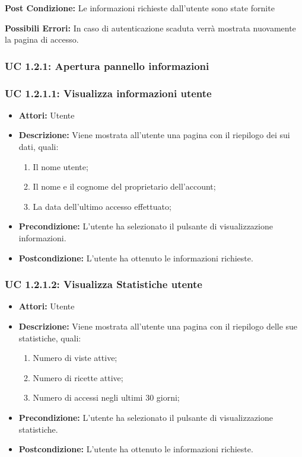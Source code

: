 \textbf{Post Condizione:}
Le informazioni richieste dall'utente sono state fornite

\textbf{Possibili Errori:}
In caso di autenticazione scaduta verrà mostrata nuovamente la pagina di accesso.

\subsubsection{UC 1.2.1: Apertura pannello informazioni}

\subsubsection{UC 1.2.1.1: Visualizza informazioni utente}

\begin{itemize}
\item \textbf{Attori:} Utente
\item \textbf{Descrizione:} Viene mostrata all'utente una pagina con il riepilogo dei sui dati, quali:
\begin{enumerate}
\item Il nome utente;
\item Il nome e il cognome del proprietario dell'account;
\item La data dell'ultimo accesso effettuato;
\end{enumerate}
\item \textbf{Precondizione:} L'utente ha selezionato il pulsante di visualizzazione informazioni.
\item \textbf{Postcondizione:} L'utente ha ottenuto le informazioni richieste.
\end{itemize}

\subsubsection{UC 1.2.1.2: Visualizza Statistiche utente}

\begin{itemize}
\item \textbf{Attori:} Utente
\item \textbf{Descrizione:} Viene mostrata all'utente una pagina con il riepilogo delle sue statistiche, quali:
\begin{enumerate}
\item Numero di viste attive;
\item Numero di ricette attive;
\item Numero di accessi negli ultimi 30 giorni;
\end{enumerate}
\item \textbf{Precondizione:} L'utente ha selezionato il pulsante di visualizzazione statistiche.
\item \textbf{Postcondizione:} L'utente ha ottenuto le informazioni richieste.
\end{itemize}



